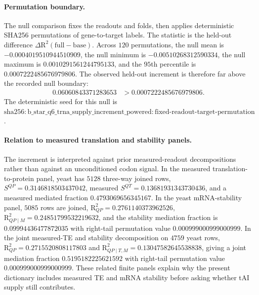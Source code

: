 \paragraph{Permutation boundary.}
The null comparison fixes the readouts and folds, then applies deterministic SHA256 permutations of gene-to-target labels.  The statistic is the held-out difference $\Delta \mathrm{R}^{2}(\mathrm{full}-\mathrm{base})$.  Across $120$ permutations, the null mean is $-0.0004019510944510909$, the null minimum is $-0.00510268312590334$, the null maximum is $0.0010291561244795133$, and the $95$th percentile is $0.0007222485676979806$.  The observed held-out increment is therefore far above the recorded null boundary:
$$
\begin{aligned}
0.06060843371283653 &> 0.0007222485676979806 .
\end{aligned}
$$
The deterministic seed for this null is
$\mathrm{sha256{:}b\_star\_q6\_trna\_supply\_increment\_powered{:}fixed\mbox{-}readout\mbox{-}target\mbox{-}permutation}$.

\paragraph{Relation to measured translation and stability panels.}
The increment is interpreted against prior measured-readout decompositions rather than against an unconditioned codon signal.  In the measured translation-to-protein panel, yeast has $5128$ three-way joined rows, $S^{QP}=0.3146818503437042$, measured $S^{QT}=0.13681931343730436$, and a measured mediated fraction $0.4793069656345167$.  In the yeast mRNA-stability panel, $5085$ rows are joined, $\mathrm{R}^{2}_{QP}=0.2761140373962526$, $\mathrm{R}^{2}_{QP\mid M}=0.24851799532219632$, and the stability mediation fraction is $0.09994436477872035$ with right-tail permutation value $0.000999000999000999$.  In the joint measured-TE and stability decomposition on $4759$ yeast rows, $\mathrm{R}^{2}_{QP}=0.2715520808117803$ and $\mathrm{R}^{2}_{QP\mid T,M}=0.13047582645538838$, giving a joint mediation fraction $0.5195182225621592$ with right-tail permutation value $0.000999000999000999$.  These related finite panels explain why the present dictionary includes measured TE and mRNA stability before asking whether tAI supply still contributes.

